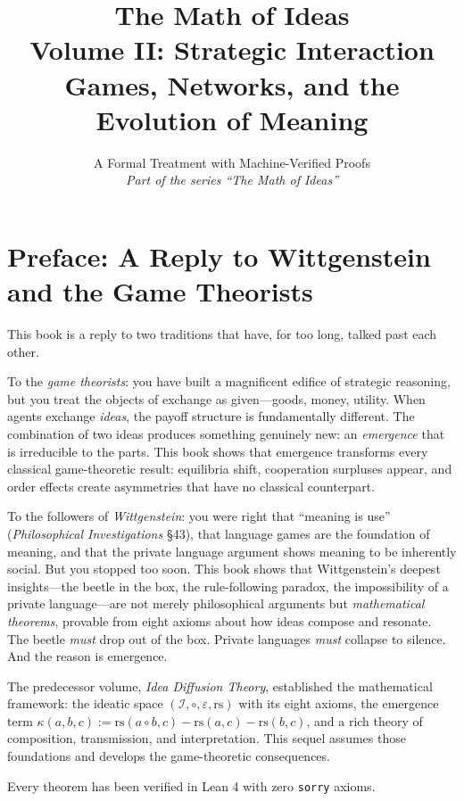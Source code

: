 \documentclass[11pt,oneside]{book}
\title{\Huge\bfseries The Math of Ideas\\[0.3em]
\LARGE Volume II: Strategic Interaction\\[0.5em]
\Large Games, Networks, and the Evolution of Meaning}
\author{A Formal Treatment with Machine-Verified Proofs\\[0.3em]
\normalsize\textit{Part of the series ``The Math of Ideas''}}
\date{}
\theoremstyle{plain}
\theoremstyle{definition}
\theoremstyle{remark}
\newcommand{\rs}{\mathrm{rs}}
\newcommand{\emerge}{\kappa}
\newcommand{\compose}{\circ}
\newcommand{\void}{\varepsilon}
\newcommand{\IS}{\mathcal{I}}
\begin{document}
\maketitle

\frontmatter

\chapter*{Preface: A Reply to Wittgenstein and the Game Theorists}

This book is a reply to two traditions that have, for too long, talked past
each other.

To the \emph{game theorists}: you have built a magnificent edifice of
strategic reasoning, but you treat the objects of exchange as given---goods,
money, utility. When agents exchange \emph{ideas}, the payoff structure is
fundamentally different. The combination of two ideas produces something
genuinely new: an \emph{emergence} that is irreducible to the parts. This
book shows that emergence transforms every classical game-theoretic result:
equilibria shift, cooperation surpluses appear, and order effects create
asymmetries that have no classical counterpart.

To the followers of \emph{Wittgenstein}: you were right that ``meaning is use''
(\emph{Philosophical Investigations} \S43), that language games are the
foundation of meaning, and that the private language argument shows meaning
to be inherently social. But you stopped too soon. This book shows that
Wittgenstein's deepest insights---the beetle in the box, the rule-following
paradox, the impossibility of a private language---are not merely philosophical
arguments but \emph{mathematical theorems}, provable from eight axioms about how
ideas compose and resonate. The beetle \emph{must} drop out of the box. Private
languages \emph{must} collapse to silence. And the reason is emergence.

The predecessor volume, \emph{Idea Diffusion Theory}, established the
mathematical framework: the ideatic space $(\IS, \compose, \void, \rs)$ with
its eight axioms, the emergence term $\emerge(a,b,c) := \rs(a \compose b, c) -
\rs(a,c) - \rs(b,c)$, and a rich theory of composition, transmission, and
interpretation. This sequel assumes those foundations and develops the
game-theoretic consequences.

Every theorem has been verified in Lean 4 with zero \texttt{sorry} axioms.

\tableofcontents
\end{document}
